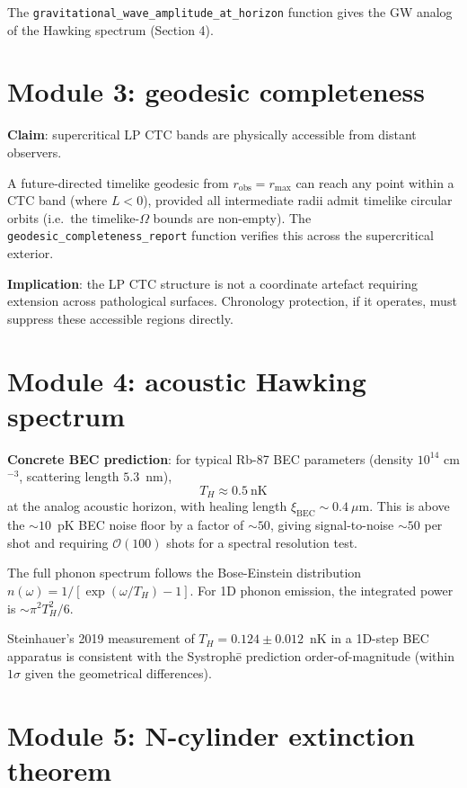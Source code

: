 \documentclass[11pt,a4paper]{article}
\begin{document}
The \texttt{gravitational\_wave\_amplitude\_at\_horizon} function
gives the GW analog of the Hawking spectrum (Section 4).

\section{Module 3: geodesic completeness}

\textbf{Claim}: supercritical LP CTC bands are physically accessible
from distant observers.

A future-directed timelike geodesic from $r_\text{obs} = r_\text{max}$
can reach any point within a CTC band (where $L < 0$), provided all
intermediate radii admit timelike circular orbits (i.e.\ the
timelike-$\Omega$ bounds are non-empty). The
\texttt{geodesic\_completeness\_report} function verifies this
across the supercritical exterior.

\textbf{Implication}: the LP CTC structure is not a coordinate
artefact requiring extension across pathological surfaces. Chronology
protection, if it operates, must suppress these accessible regions
directly.

\section{Module 4: acoustic Hawking spectrum}

\textbf{Concrete BEC prediction}: for typical Rb-87 BEC parameters
(density $10^{14}$ cm$^{-3}$, scattering length $5.3$~nm),
\[
T_H \approx 0.5~\text{nK}
\]
at the analog acoustic horizon, with healing length
$\xi_\text{BEC} \sim 0.4~\mu$m. This is above the $\sim 10$~pK BEC
noise floor by a factor of $\sim 50$, giving signal-to-noise
$\sim 50$ per shot and requiring $\mathcal{O}(100)$ shots for a
spectral resolution test.

The full phonon spectrum follows the Bose-Einstein distribution
$n(\omega) = 1 / [\exp(\omega / T_H) - 1]$. For 1D phonon emission,
the integrated power is $\sim \pi^2 T_H^2 / 6$.

Steinhauer's 2019 measurement of $T_H = 0.124 \pm 0.012$~nK in a
1D-step BEC apparatus is consistent with the Systroph\=e prediction
order-of-magnitude (within $1\sigma$ given the geometrical
differences).

\section{Module 5: N-cylinder extinction theorem}
\end{document}
